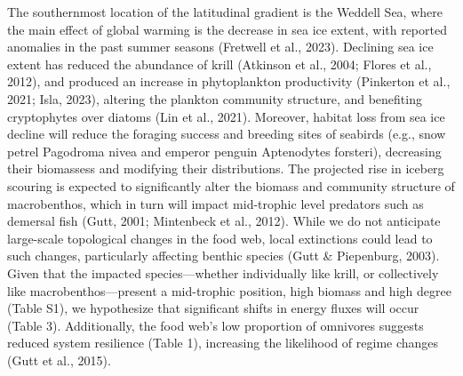 \documentclass[
]{article}
\begin{document}
The southernmost location of the latitudinal gradient is the Weddell
Sea, where the main effect of global warming is the decrease in sea ice
extent, with reported anomalies in the past summer seasons (Fretwell et
al., 2023). Declining sea ice extent has reduced the abundance of krill
(Atkinson et al., 2004; Flores et al., 2012), and produced an increase
in phytoplankton productivity (Pinkerton et al., 2021; Isla, 2023),
altering the plankton community structure, and benefiting cryptophytes
over diatoms (Lin et al., 2021). Moreover, habitat loss from sea ice
decline will reduce the foraging success and breeding sites of seabirds
(e.g., snow petrel Pagodroma nivea and emperor penguin Aptenodytes
forsteri), decreasing their biomassess and modifying their
distributions. The projected rise in iceberg scouring is expected to
significantly alter the biomass and community structure of macrobenthos,
which in turn will impact mid-trophic level predators such as demersal
fish (Gutt, 2001; Mintenbeck et al., 2012). While we do not anticipate
large-scale topological changes in the food web, local extinctions could
lead to such changes, particularly affecting benthic species (Gutt \&
Piepenburg, 2003). Given that the impacted species---whether
individually like krill, or collectively like macrobenthos---present a
mid-trophic position, high biomass and high degree (Table S1), we
hypothesize that significant shifts in energy fluxes will occur (Table
3). Additionally, the food web's low proportion of omnivores suggests
reduced system resilience (Table 1), increasing the likelihood of regime
changes (Gutt et al., 2015).
\end{document}
